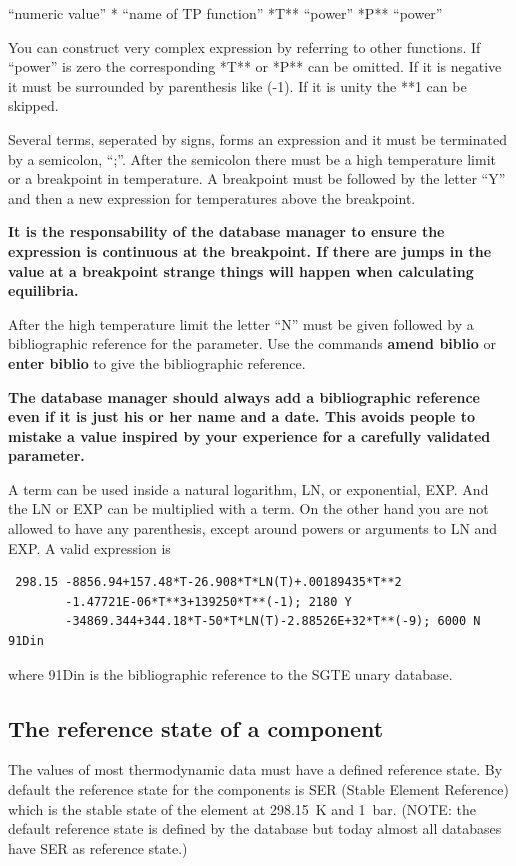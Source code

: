 \documentclass[11pt]{article}
\begin{document}
``numeric value'' * ``name of TP function'' *T** ``power'' *P** ``power'' 

You can construct very complex expression by referring to other
functions.  If ``power'' is zero the corresponding *T** or *P** can be
omitted.  If it is negative it must be surrounded by parenthesis like
(-1).  If it is unity the **1 can be skipped.

Several terms, seperated by signs, forms an expression and it must be
terminated by a semicolon, ``;''.  After the semicolon there must be a
high temperature limit or a breakpoint in temperature.  A breakpoint
must be followed by the letter ``Y'' and then a new expression for
temperatures above the breakpoint.  

{\bf It is the responsability of the database manager to ensure the
  expression is continuous at the breakpoint.  If there are jumps in
  the value at a breakpoint strange things will happen when
  calculating equilibria.}

After the high temperature limit the letter ``N'' must be given
followed by a bibliographic reference for the parameter.  Use the
commands {\bf amend biblio} or {\bf enter biblio} to give the
bibliographic reference.

{\bf The database manager should always add a bibliographic reference
  even if it is just his or her name and a date.  This avoids people
  to mistake a value inspired by your experience for a carefully
  validated parameter.}

A term can be used inside a natural logarithm, LN, or exponential,
EXP. And the LN or EXP can be multiplied with a term.  On the other
hand you are not allowed to have any parenthesis, except around powers
or arguments to LN and EXP.  A valid expression is

\begin{verbatim}
 298.15 -8856.94+157.48*T-26.908*T*LN(T)+.00189435*T**2
        -1.47721E-06*T**3+139250*T**(-1); 2180 Y 
        -34869.344+344.18*T-50*T*LN(T)-2.88526E+32*T**(-9); 6000 N 91Din
\end{verbatim}

where 91Din is the bibliographic reference to the SGTE unary database.

\subsection{The reference state of a component}\label{sc:refstate}

The values of most thermodynamic data must have a defined reference
state.  By default the reference state for the components is SER
(Stable Element Reference) which is the stable state of the element at
298.15~K and 1~bar.  (NOTE: the default reference state is defined by
the database but today almost all databases have SER as reference
state.)
\end{document}
